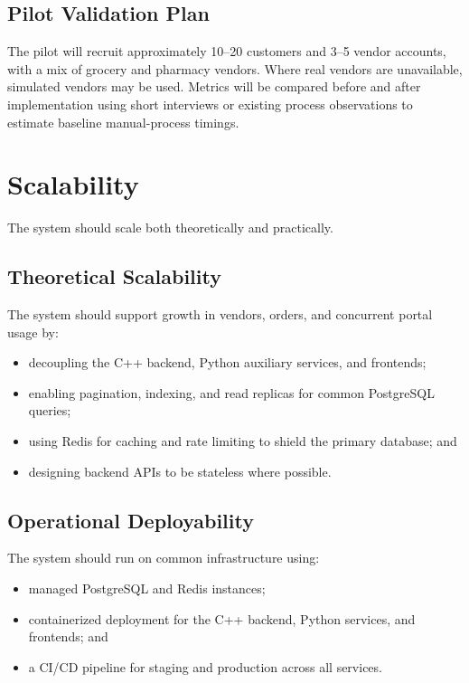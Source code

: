 \documentclass[11pt,a4paper]{article}
\begin{document}
\subsection{Pilot Validation Plan}

The pilot will recruit approximately 10--20 customers and 3--5 vendor accounts, with a mix of
grocery and pharmacy vendors. Where real vendors are unavailable, simulated vendors may be used.
Metrics will be compared before and after implementation using short interviews or existing
process observations to estimate baseline manual-process timings.

\section{Scalability}

The system should scale both theoretically and practically.

\subsection{Theoretical Scalability}

The system should support growth in vendors, orders, and concurrent portal usage by:

\begin{itemize}[leftmargin=1.5em]
    \item decoupling the C++ backend, Python auxiliary services, and frontends;
    \item enabling pagination, indexing, and read replicas for common PostgreSQL queries;
    \item using Redis for caching and rate limiting to shield the primary database; and
    \item designing backend APIs to be stateless where possible.
\end{itemize}

\subsection{Operational Deployability}

The system should run on common infrastructure using:

\begin{itemize}[leftmargin=1.5em]
    \item managed PostgreSQL and Redis instances;
    \item containerized deployment for the C++ backend, Python services, and frontends; and
    \item a CI/CD pipeline for staging and production across all services.
\end{itemize}
\end{document}
